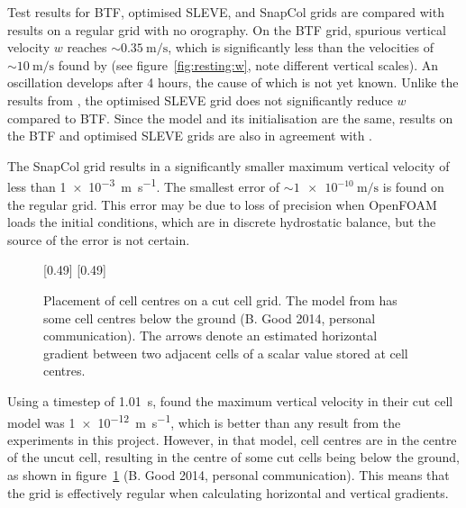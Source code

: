 Test results for BTF, optimised SLEVE, and SnapCol grids are compared with results on a regular grid with no orography.  On the BTF grid, spurious vertical velocity $w$ reaches $\sim \SI{0.35}{\meter\per\second}$, which is significantly less than the velocities of $\sim \SI{10}{\meter\per\second}$ found by \textcite{klemp2011} (see figure~\ref{fig:resting:w}, note different vertical scales).  An oscillation develops after 4 hours, the cause of which is not yet known.  Unlike the results from \textcite{klemp2011}, the optimised SLEVE grid does not significantly reduce $w$ compared to BTF.  Since the model and its initialisation are the same, results on the BTF and optimised SLEVE grids are also in agreement with \textcite{weller-shahrokhi2014}.

The SnapCol grid results in a significantly smaller maximum vertical velocity of less than \SI{1e-3}{\meter\per\second}.  The smallest error of $\sim \SI{1e-10}{\meter\per\second}$ is found on the regular grid.  This error may be due to loss of precision when OpenFOAM loads the initial conditions, which are in discrete hydrostatic balance, but the source of the error is not certain.

\begin{figure}
	\captionsetup[subfigure]{position=b}
	\centering
	[0.49\textwidth]{}
	\hfill
	[0.49\textwidth]{}
%
	\caption{Placement of cell centres on a cut cell grid.  The model from \textcite{good2013} has some cell centres below the ground (B. Good 2014, personal communication).  The arrows denote an estimated horizontal gradient between two adjacent cells of a scalar value stored at cell centres.}
	\label{fig:resting:good}
\end{figure}

Using a timestep of \SI{1.01}{\second}, \textcite{good2013} found the maximum vertical velocity in their cut cell model was \SI{1e-12}{\meter\per\second}, which is better than any result from the experiments in this project.  However, in that model, cell centres are in the centre of the uncut cell, resulting in the centre of some cut cells being below the ground, as shown in figure~\ref{fig:resting:good} (B. Good 2014, personal communication).  This means that the grid is effectively regular when calculating horizontal and vertical gradients.

